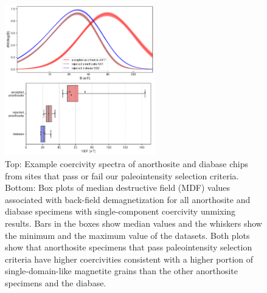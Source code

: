 \begin{figure}
\noindent\includegraphics[width=0.58\textwidth]{figure/Zhang2022/coercivity.pdf}
\centering
\caption{\footnotesize{Top: Example coercivity spectra of anorthosite and diabase chips from sites that pass or fail our paleointensity selection criteria. Bottom: Box plots of median destructive field (MDF) values associated with back-field demagnetization for all anorthosite and diabase specimens with single-component coercivity unmixing results. Bars in the boxes show median values and the whiskers show the minimum and the maximum value of the datasets. Both plots show that anorthosite specimens that pass paleointensity selection criteria have higher coercivities consistent with a higher portion of single-domain-like magnetite grains than the other anorthosite specimens and the diabase.}}
\label{fig:coercivity}
\end{figure}

